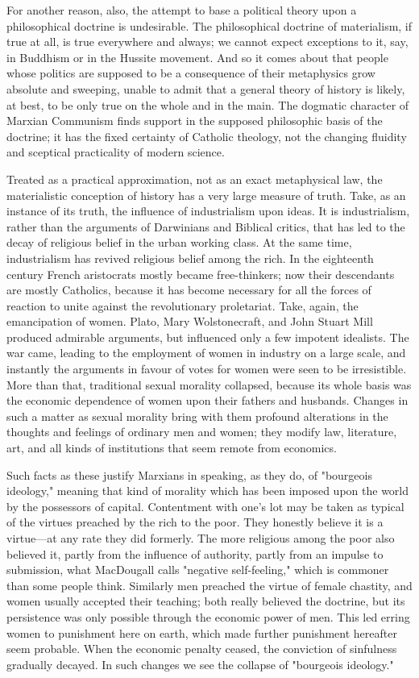 For another reason, also, the attempt to base a political theory upon a philosophical doctrine is undesirable. The philosophical doctrine of materialism, if true at all, is true everywhere and always; we cannot expect exceptions to it, say, in Buddhism or in the Hussite movement. And so it comes about that people whose politics are supposed to be a consequence of their metaphysics grow absolute and sweeping, unable to admit that a general theory of history is likely, at best, to be only true on the whole and in the main. The dogmatic character of Marxian Communism finds support in the supposed philosophic basis of the doctrine; it has the fixed certainty of Catholic theology, not the changing fluidity and sceptical practicality of modern science.

Treated as a practical approximation, not as an exact metaphysical law, the materialistic conception of history has a very large measure of truth. Take, as an instance of its truth, the influence of industrialism upon ideas. It is industrialism, rather than the arguments of Darwinians and Biblical critics, that has led to the decay of religious belief in the urban working class. At the same time, industrialism has revived religious belief among the rich. In the eighteenth century French aristocrats mostly became free-thinkers; now their descendants are mostly Catholics, because it has become necessary for all the forces of reaction to unite against the revolutionary proletariat. Take, again, the emancipation of women. Plato, Mary Wolstonecraft, and John Stuart Mill produced admirable arguments, but influenced only a few impotent idealists. The war came, leading to the employment of women in industry on a large scale, and instantly the arguments in favour of votes for women were seen to be irresistible. More than that, traditional sexual morality collapsed, because its whole basis was the economic dependence of women upon their fathers and husbands. Changes in such a matter as sexual morality bring with them profound alterations in the thoughts and feelings of ordinary men and women; they modify law, literature, art, and all kinds of institutions that seem remote from economics.

Such facts as these justify Marxians in speaking, as they do, of "bourgeois ideology," meaning that kind of morality which has been imposed upon the world by the possessors of capital. Contentment with one's lot may be taken as typical of the virtues preached by the rich to the poor. They honestly believe it is a virtue---at any rate they did formerly. The more religious among the poor also believed it, partly from the influence of authority, partly from an impulse to submission, what MacDougall calls "negative self-feeling," which is commoner than some people think. Similarly men preached the virtue of female chastity, and women usually accepted their teaching; both really believed the doctrine, but its persistence was only possible through the economic power of men. This led erring women to punishment here on earth, which made further punishment hereafter seem probable. When the economic penalty ceased, the conviction of sinfulness gradually decayed. In such changes we see the collapse of "bourgeois ideology."

